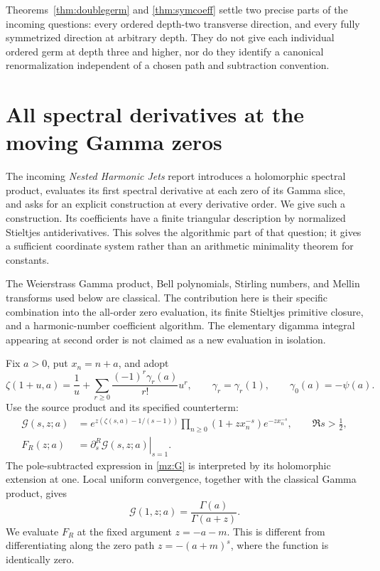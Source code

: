 \documentclass[11pt,letterpaper]{article}
\numberwithin{equation}{section}
\theoremstyle{plain}
\theoremstyle{definition}
\theoremstyle{remark}
\begin{document}
Theorems~\ref{thm:doublegerm} and \ref{thm:symcoeff} settle two precise
parts of the incoming questions: every ordered depth-two transverse
direction, and every fully symmetrized direction at arbitrary depth.
They do not give each individual ordered germ at depth three and higher,
nor do they identify a canonical renormalization independent of a chosen
path and subtraction convention.



\section{All spectral derivatives at the moving Gamma zeros}
\label{mz:sec:zeros}\label{sec:roots}

The incoming \emph{Nested Harmonic Jets} report \cite{nested} introduces a holomorphic
spectral product, evaluates its first spectral derivative at each zero of
its Gamma slice, and asks for an explicit construction at every derivative
order. We give such a construction. Its coefficients have a finite
triangular description by normalized Stieltjes antiderivatives. This solves
the algorithmic part of that question; it gives a sufficient coordinate
system rather than an arithmetic minimality theorem for constants.

The Weierstrass Gamma product, Bell polynomials, Stirling numbers, and
Mellin transforms used below are classical. The contribution here is their
specific combination into the all-order zero evaluation, its finite
Stieltjes primitive closure, and a harmonic-number coefficient algorithm.
The elementary digamma integral appearing at second order is not claimed
as a new evaluation in isolation.

Fix $a>0$, put $x_n=n+a$, and adopt
\[
 \zeta(1+u,a)=\frac1u+
       \sum_{r\ge0}\frac{(-1)^r\gamma_r(a)}{r!}u^r,
 \qquad \gamma_r=\gamma_r(1),\qquad \gamma_0(a)=-\psi(a).
\]
Use the source product and its specified counterterm:
\begin{align}
 \mathcal G(s,z;a)
 &=e^{z(\zeta(s,a)-1/(s-1))}
       \prod_{n\ge0}(1+zx_n^{-s})e^{-zx_n^{-s}},
       \qquad \Re s>\tfrac12,\label{mz:G}\\
 F_R(z;a)&=\left.\partial_s^R\mathcal G(s,z;a)\right|_{s=1}.
 \label{mz:F}
\end{align}
The pole-subtracted expression in \eqref{mz:G} is interpreted by its
holomorphic extension at one. Local uniform convergence, together with the
classical Gamma product, gives
\[
 \mathcal G(1,z;a)=\frac{\Gamma(a)}{\Gamma(a+z)}.
\]
We evaluate $F_R$ at the fixed argument $z=-a-m$. This is different from
differentiating along the zero path $z=-(a+m)^s$, where the function is
identically zero.
\end{document}
